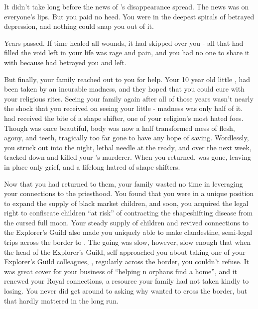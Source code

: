 \documentclass[char]{NeptuneBall}
\begin{document}
It didn't take long before the news of \cAriel{}'s disappearance spread. The news was on everyone's lips. But you paid no heed. You were in the deepest spirals of betrayed depression, and nothing could snap you out of it.

Years passed. If time healed all wounds, it had skipped over you - all that had filled the void left in your life was rage and pain, and you had no one to share it with because \emph{\cAriel{\they}} had betrayed you and left.

But finally, your family reached out to you for help. Your 10 year old little \cSister{\sibling}, \cSister{} had been taken by an incurable madness, and they hoped that you could cure \cSister{\them} with your religious rites. Seeing your family again after all of those years wasn't nearly the shock that you received on seeing your little \cSister{\sibling} - madness was only half of it. \cSister{\They} had received the bite of a shape shifter, one of your religion's most hated foes. Though \cSister{\they} was once beautiful, \cSister{\them} body was now a half transformed mess of flesh, agony, and teeth, tragically too far gone to have any hope of saving. Wordlessly, you struck out into the night, lethal needle at the ready, and over the next week, tracked down and killed your \cSister{\sibling}'s murderer. When you returned, \cSister{} was gone, leaving in \cSister{\them} place only grief, and a lifelong hatred of shape shifters.

Now that you had returned to them, your family wasted no time in leveraging your connections to the priesthood. You found that you were in a unique position to expand the supply of black market children, and soon, you acquired the legal right to confiscate children ``at risk'' of contracting the shapeshifting disease from the cursed full moon. Your steady supply of children and revived connections to the Explorer's Guild also made you uniquely able to make clandestine, semi-legal trips across the border to \pPacifica{}. The going was slow, however, slow enough that when the head of the Explorer's Guild, \cPlant{\Prince} \cPlant{} \cPlant{\them}self approached you about taking one of your Explorer's Guild colleagues, \cPlant{\their} \cPrincess{\nephew}, \cPrincess{\Prince} \cPrincess{} regularly across the border, you couldn't refuse. It was great cover for your business of ``helping \pAtlantis{}n orphans find a home'', and it renewed your Royal connections, a resource your family had not taken kindly to losing. You never did get around to asking why \cPrincess{\they} wanted to cross the border, but that hardly mattered in the long run.
\end{document}
